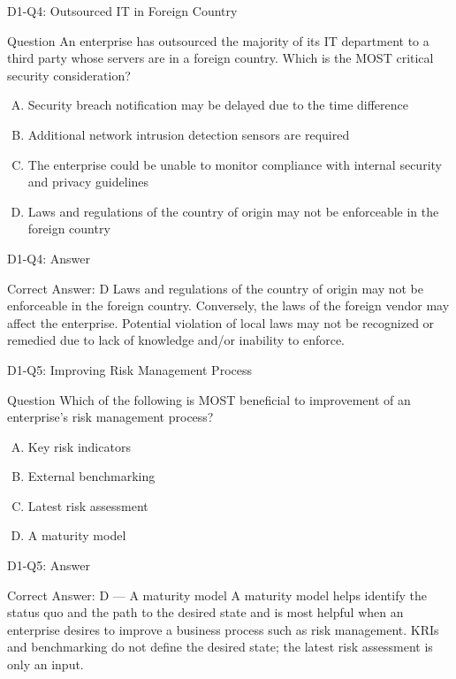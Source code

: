 \documentclass{beamer}
\begin{document}
	\begin{frame}{D1-Q4: Outsourced IT in Foreign Country}
		\begin{block}{Question}
			An enterprise has outsourced the majority of its IT department to a third party whose servers are in a foreign country. Which is the MOST critical security consideration?
		\end{block}
		\begin{enumerate}[(A)]
			\item Security breach notification may be delayed due to the time difference
			\item Additional network intrusion detection sensors are required
			\item The enterprise could be unable to monitor compliance with internal security and privacy guidelines
			\item Laws and regulations of the country of origin may not be enforceable in the foreign country
		\end{enumerate}
	\end{frame}
	\begin{frame}{D1-Q4: Answer}
		\begin{block}{Correct Answer: D}
			Laws and regulations of the country of origin may not be enforceable in the foreign country. Conversely, the laws of the foreign vendor may affect the enterprise. Potential violation of local laws may not be recognized or remedied due to lack of knowledge and/or inability to enforce.
		\end{block}
	\end{frame}
	
	\begin{frame}{D1-Q5: Improving Risk Management Process}
		\begin{block}{Question}
			Which of the following is MOST beneficial to improvement of an enterprise's risk management process?
		\end{block}
		\begin{enumerate}[(A)]
			\item Key risk indicators
			\item External benchmarking
			\item Latest risk assessment
			\item A maturity model
		\end{enumerate}
	\end{frame}
	\begin{frame}{D1-Q5: Answer}
		\begin{block}{Correct Answer: D --- A maturity model}
			A maturity model helps identify the status quo and the path to the desired state and is most helpful when an enterprise desires to improve a business process such as risk management. KRIs and benchmarking do not define the desired state; the latest risk assessment is only an input.
		\end{block}
	\end{frame}
	
\end{document}
